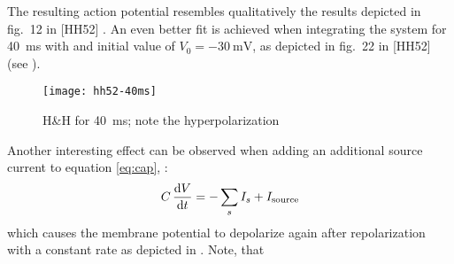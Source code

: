 The resulting action potential resembles qualitatively the results depicted in
fig.~12 in [HH52] . An even
better fit is achieved when integrating the system for \SI{40}{\milli\second}
with and initial value of $V_0=\SI{-30}{\milli\volt}$, as depicted in fig.~22
in [HH52] (see ).

\begin{figure}[h]
    \centering
    \texttt{[image: hh52-40ms]}
    \label{fig:hh2}
    \caption{H\&H for \SI{40}{\milli\second}; note the hyperpolarization}
\end{figure}

Another interesting effect can be observed when adding an additional source
current to equation \eqref{eq:cap}, \ie:
\begin{equation*}
    C\,\dv{V}{t}=-\sum_{s}I_{s} + I_{\mathrm{source}}
\end{equation*}
which causes the membrane potential to depolarize again after repolarization
with a constant rate as depicted in . Note, that 



